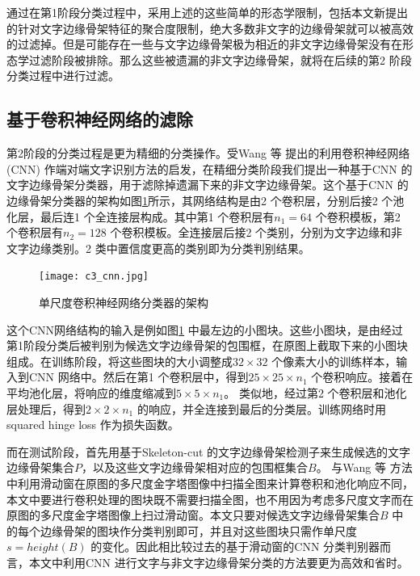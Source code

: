         通过在第1阶段分类过程中，采用上述的这些简单的形态学限制，包括本文新提出的针对文字边缘骨架特征的聚合度限制，绝大多数非文字的边缘骨架就可以被高效的过滤掉。但是可能存在一些与文字边缘骨架极为相近的非文字边缘骨架没有在形态学过滤阶段被排除。那么这些被遗漏的非文字边缘骨架，就将在后续的第2 阶段分类过程中进行过滤。

        \subsection{基于卷积神经网络的滤除}

        第2阶段的分类过程是更为精细的分类操作。受Wang 等\cite{Wang2012End} 提出的利用卷积神经网络(CNN) 作端对端文字识别方法的启发，在精细分类阶段我们提出一种基于CNN 的文字边缘骨架分类器，用于滤除掉遗漏下来的非文字边缘骨架。这个基于CNN 的边缘骨架分类器的架构如图\ref{fig.c3_cnn}所示，其网络结构是由2 个卷积层，分别后接2 个池化层，最后连1 个全连接层构成。其中第1 个卷积层有$n_1 = 64$ 个卷积模板，第2 个卷积层有$n_2 = 128$ 个卷积模板。全连接层后接2 个类别，分别为文字边缘和非文字边缘类别。2 类中置信度更高的类别即为分类判别结果。

        \begin{figure}[!h]
        \centering
        \texttt{[image: c3\_cnn.jpg]}
        \caption{单尺度卷积神经网络分类器的架构} \label{fig.c3_cnn}
        \end{figure}

        这个CNN网络结构的输入是例如图\ref{fig.c3_cnn} 中最左边的小图块。这些小图块，是由经过第1阶段分类后被判别为候选文字边缘骨架的包围框，在原图上截取下来的小图块组成。在训练阶段，将这些图块的大小调整成$32 \times 32$ 个像素大小的训练样本，输入到CNN 网络中。然后在第1 个卷积层中，得到$25 \times 25 \times n_1$ 个卷积响应。接着在平均池化层，将响应的维度缩减到$5 \times 5 \times n_1$。 类似地，经过第2 个卷积层和池化层处理后，得到$2 \times 2\times n_1$ 的响应，并全连接到最后的分类层。训练网络时用squared hinge loss 作为损失函数。

        而在测试阶段，首先用基于Skeleton-cut 的文字边缘骨架检测子来生成候选的文字边缘骨架集合$P$，以及这些文字边缘骨架相对应的包围框集合$B$。 与Wang 等\cite{Wang2012End} 方法中利用滑动窗在原图的多尺度金字塔图像中扫描全图来计算卷积和池化响应不同，本文中要进行卷积处理的图块既不需要扫描全图，也不用因为考虑多尺度文字而在原图的多尺度金字塔图像上扫过滑动窗。本文只要对候选文字边缘骨架集合$B$ 中的每个边缘骨架的图块作分类判别即可，并且对这些图块只需作单尺度$s = height(B)$ 的变化。因此相比较过去的基于滑动窗的CNN 分类判别器而言，本文中利用CNN 进行文字与非文字边缘骨架分类的方法要更为高效和省时。

